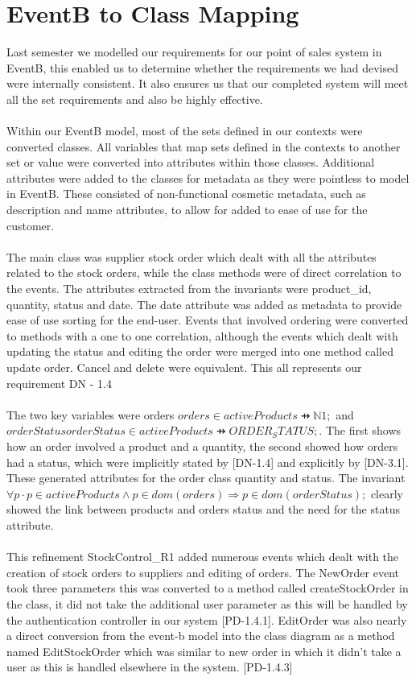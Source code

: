 \documentclass[a4paper]{article}
\begin{document}
\section{EventB to Class Mapping}
Last semester we modelled our requirements for our point of sales system in EventB, this enabled us to determine whether the requirements we had devised were internally consistent. It also ensures us that our completed system will meet all the set requirements and also be highly effective.
\\\\
Within our EventB model, most of the sets defined in our contexts were converted classes. All variables that map sets defined in the contexts to another set or value were converted into attributes within those classes. Additional attributes were added to the classes for metadata as they were pointless to model in EventB. These consisted of non-functional cosmetic metadata, such as description and name attributes, to allow for added to ease of use for the customer.
\\\\
The main class was supplier stock order which dealt with all the attributes related to the stock orders, while the class methods were of direct correlation to the events. The attributes extracted from the invariants were product\_id, quantity, status and date. The date attribute was added as metadata to provide ease of use sorting for the end-user. Events that involved ordering were converted to methods with a one to one correlation, although the events which dealt with updating the status and editing the order were merged into one method called update order. Cancel and delete were equivalent. This all represents our requirement DN - 1.4
\\\\
The two key variables were orders \(orders ∈ activeProducts ⇸ ℕ1;\) and \(orderStatus orderStatus ∈ activeProducts ⇸ ORDER_STATUS;\).
The first shows how an order involved a product and a quantity, the second showed how orders had a status, which were implicitly stated by [DN-1.4] and explicitly by [DN-3.1]. These generated attributes for the order class quantity and status. The invariant \(∀p · p ∈ activeProducts ∧ p ∈ dom(orders) ⇒ p ∈ dom(orderStatus);\) clearly showed the link between products and orders status and the need for the status attribute.
\\\\
This refinement StockControl\_R1 added numerous events which dealt with the creation of stock orders to suppliers and editing of orders. The NewOrder event took three parameters this was converted to a method called createStockOrder in the class, it did not take the additional user parameter as this will be handled by the authentication controller in our system [PD-1.4.1]. EditOrder was also nearly a direct conversion from the event-b model into the class diagram as a method named EditStockOrder which was similar to new order in which it didn't take a user as this is handled elsewhere in the system. [PD-1.4.3]
\end{document}
